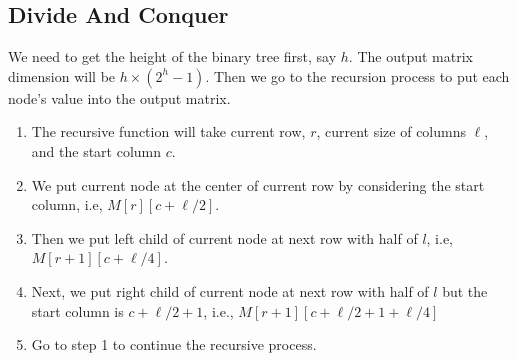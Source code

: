 \subsection{Divide And Conquer}
We need to get the height of the binary tree first, say $h$. The output matrix dimension will be $h\times (2^h-1)$. Then we go to the recursion process to put each node's value into the output matrix.
\begin{enumerate}
\item The recursive function will take current row, $r$, current size of columns $\ell$, and the start column $c$.
\item We put current node at the center of current row by considering the start column, i.e, $M[r][c + \ell/2]$.
\item Then we put left child of current node at next row with half of $l$, i.e, $M[r+1][c+\ell/4]$.
\item Next, we put right child of current node at next row with half of $l$ but the start column is $c+\ell/2+1$, i.e., $M[r+1][c+\ell/2+1+\ell/4]$
\item Go to step 1 to continue the recursive process. 
\end{enumerate}